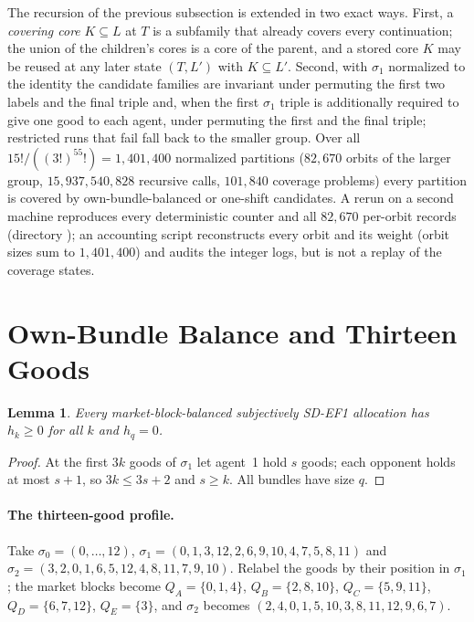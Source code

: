\documentclass[11pt]{article}
\newtheorem{lemma}[theorem]{Lemma}
\theoremstyle{definition}
\begin{document}
The recursion of the previous subsection is extended in two exact ways. First, a \emph{covering core} $K\subseteq L$ at $T$ is a subfamily that already covers every continuation; the union of the children's cores is a core of the parent, and a stored core $K$ may be reused at any later state $(T,L')$ with $K\subseteq L'$. Second, with $\sigma_1$ normalized to the identity the candidate families are invariant under permuting the first two labels and the final triple and, when the first $\sigma_1$ triple is additionally required to give one good to each agent, under permuting the first and the final triple; restricted runs that fail fall back to the smaller group. Over all $15!/((3!)^55!)=1{,}401{,}400$ normalized partitions ($82{,}670$ orbits of the larger group, $15{,}937{,}540{,}828$ recursive calls, $101{,}840$ coverage problems) every partition is covered by own-bundle-balanced or one-shift candidates. A rerun on a second machine reproduces every deterministic counter and all $82{,}670$ per-orbit records (directory ); an accounting script reconstructs every orbit and its weight (orbit sizes sum to $1{,}401{,}400$) and audits the integer logs, but is not a replay of the coverage states.

\section{Own-Bundle Balance and Thirteen Goods}\label{app:fifteen}
\begin{lemma}
Every market-block-balanced subjectively SD-EF1 allocation has $h_k\ge0$ for all $k$ and $h_q=0$.
\end{lemma}
\begin{proof}
At the first $3k$ goods of $\sigma_1$ let agent~1 hold $s$ goods; each opponent holds at most $s+1$, so $3k\le3s+2$ and $s\ge k$. All bundles have size $q$.
\end{proof}

\paragraph{The thirteen-good profile.}
Take $\sigma_0=(0,\dots,12)$, $\sigma_1=(0,1,3,12,2,6,9,10,4,7,5,8,11)$ and $\sigma_2=(3,2,0,1,6,5,12,4,8,11,7,9,10)$. Relabel the goods by their position in $\sigma_1$; the market blocks become $Q_A=\{0,1,4\}$, $Q_B=\{2,8,10\}$, $Q_C=\{5,9,11\}$, $Q_D=\{6,7,12\}$, $Q_E=\{3\}$, and $\sigma_2$ becomes $(2,4,0,1,5,10,3,8,11,12,9,6,7)$.
\end{document}
